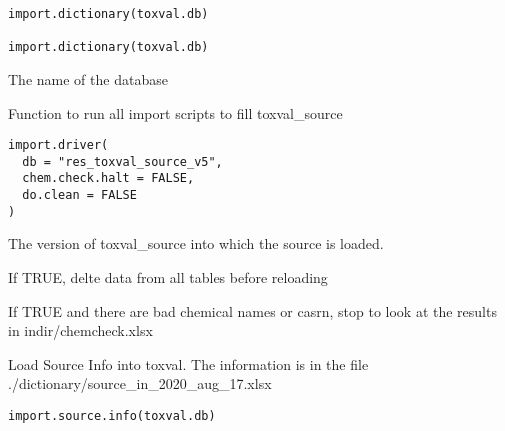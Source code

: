\documentclass[letterpaper]{book}
\begin{document}
%
\begin{Usage}
\begin{verbatim}
import.dictionary(toxval.db)

import.dictionary(toxval.db)
\end{verbatim}
\end{Usage}
%
\begin{Arguments}
\begin{ldescription}
\item[\code{toxval.db}] The name of the database
\end{ldescription}
\end{Arguments}
%
\begin{Description}\relax
Function to run all import scripts to fill toxval\_source
\end{Description}
%
\begin{Usage}
\begin{verbatim}
import.driver(
  db = "res_toxval_source_v5",
  chem.check.halt = FALSE,
  do.clean = FALSE
)
\end{verbatim}
\end{Usage}
%
\begin{Arguments}
\begin{ldescription}
\item[\code{db}] The version of toxval\_source into which the source is loaded.

\item[\code{do.clean}] If TRUE, delte data from all tables before reloading

\item[\code{chem.chek.halt}] If TRUE and there are bad chemical names or casrn,
stop to look at the results in indir/chemcheck.xlsx
\end{ldescription}
\end{Arguments}
%
\begin{Description}\relax
Load Source Info into toxval. 
The information is in the file ./dictionary/source\_in\_2020\_aug\_17.xlsx
\end{Description}
%
\begin{Usage}
\begin{verbatim}
import.source.info(toxval.db)
\end{verbatim}
\end{Usage}
\end{document}
